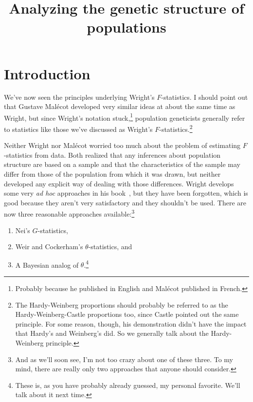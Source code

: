 \documentclass[12pt]{article}
\title{Analyzing the genetic structure of populations}
\begin{document}
\maketitle

\thispagestyle{first}

\section*{Introduction}

We've now seen the principles underlying Wright's $F$-statistics. I
should point out that Gustave Mal{\'e}cot developed very similar ideas
at about the same time as Wright, but since Wright's notation
stuck,\footnote{Probably because he published in English and
  Mal{\'e}cot published in French.} population geneticists generally
refer to statistics like those we've discussed as Wright's
$F$-statistics.\footnote{The Hardy-Weinberg proportions should
  probably be referred to as the Hardy-Weinberg-Castle proportions
  too, since Castle pointed out the same principle. For some reason,
  though, his demonstration didn't have the impact that Hardy's and
  Weinberg's did. So we generally talk about the Hardy-Weinberg
  principle.}

Neither Wright nor Mal{\'e}cot worried too much about the problem of
estimating $F$-statistics from data. Both realized that any inferences
about population structure are based on a sample and that the
characteristics of the sample may differ from those of the population
from which it was drawn, but neither developed any explicit way of
dealing with those differences. Wright develops some very {\it ad
  hoc\/} approaches in his book~\cite{Wright69}, but they have been
forgotten, which is good because they aren't very satisfactory and
they shouldn't be used. There are now three reasonable approaches
available:\footnote{And as we'll
  soon see, I'm not too crazy about one of these three. To my mind,
  there are really only two approaches that anyone should consider.}

\begin{enumerate}

\item Nei's $G$-statistics,

\item Weir and Cockerham's $\theta$-statistics, and

\item A Bayesian analog of $\theta$.\footnote{These is, as you have
  probably already guessed, my personal favorite. We'll talk about
  it next time.}

\end{enumerate}
\end{document}

